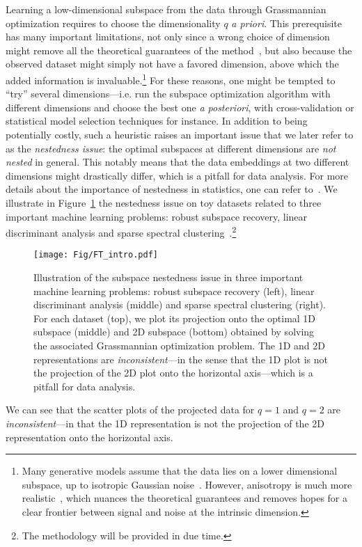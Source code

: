 Learning a low-dimensional subspace from the data through Grassmannian optimization requires to choose the dimensionality $q$ \textit{a priori}. 
This prerequisite has many important limitations, not only since a wrong choice of dimension might remove all the theoretical guarantees of the method~\citep{lerman_overview_2018}, but also because the observed dataset might simply {not} have a favored dimension, above which the added information is invaluable.\footnote{Many generative models assume that the data lies on a lower dimensional subspace, up to isotropic Gaussian noise~\citep{tipping_probabilistic_1999,lerman_robust_2015}. However, anisotropy is much more realistic~\citep{maunu_well-tempered_2019}, which nuances the theoretical guarantees and removes hopes for a clear frontier between signal and noise at the intrinsic dimension.}
For these reasons, one might be tempted to ``try'' several dimensions---i.e. run the subspace optimization algorithm with different dimensions and choose the best one \textit{a posteriori}, with cross-validation or statistical model selection techniques for instance.
In addition to being potentially costly, such a heuristic raises an important issue that we later refer to as the \textit{nestedness issue}: the optimal subspaces at different dimensions are \textit{not nested} in general.
This notably means that the data embeddings at two different dimensions might drastically differ, which is a pitfall for data analysis. For more details about the importance of nestedness in statistics, one can refer to~\citet{huckemann_intrinsic_2010, jung_analysis_2012, damon_backwards_2014, huckemann_backward_2018,pennec_barycentric_2018, lerman_overview_2018, dryden_principal_2019, yang_nested_2021, fan_nested_2022}.
We illustrate in Figure~\ref{fig:motivations} the nestedness issue on toy datasets related to three important machine learning problems: robust subspace recovery, linear discriminant analysis and sparse spectral clustering~\citep{lu_convex_2016,wang_grassmannian_2017}.\footnote{The methodology will be provided in due time.}
\begin{figure}
\centering
\texttt{[image: Fig/FT\_intro.pdf]}
\caption{Illustration of the subspace nestedness issue in three important machine learning problems: robust subspace recovery (left), linear discriminant analysis (middle) and sparse spectral clustering (right). For each dataset (top), we plot its projection onto the optimal 1D subspace (middle) and 2D subspace (bottom) obtained by solving the associated Grassmannian optimization problem. The 1D and 2D representations are \textit{inconsistent}---in the sense that the 1D plot is not the projection of the 2D plot onto the horizontal axis---which is a pitfall for data analysis.}
\label{fig:motivations}
\end{figure}
We can see that the scatter plots of the projected data for $q=1$ and $q=2$ are \textit{inconsistent}---in that the 1D representation is not the projection of the 2D representation onto the horizontal axis.



